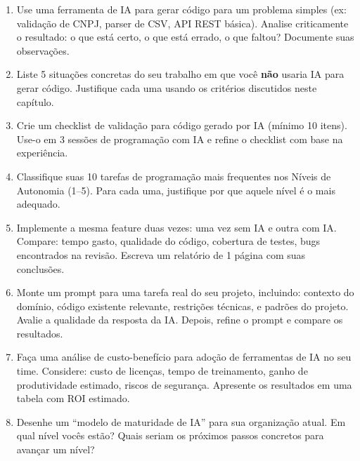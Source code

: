 \begin{enumerate}[leftmargin=2em]
    \item Use uma ferramenta de IA para gerar código para um problema
    simples (ex: validação de CNPJ, parser de CSV, API REST básica).
    Analise criticamente o resultado: o que está certo, o que está errado,
    o que faltou? Documente suas observações.

    \item Liste 5 situações concretas do seu trabalho em que você
    \textbf{não} usaria IA para gerar código. Justifique cada uma usando
    os critérios discutidos neste capítulo.

    \item Crie um checklist de validação para código gerado por IA (mínimo
    10 itens). Use-o em 3 sessões de programação com IA e refine o
    checklist com base na experiência.

    \item Classifique suas 10 tarefas de programação mais frequentes nos
    Níveis de Autonomia (1--5). Para cada uma, justifique por que aquele
    nível é o mais adequado.

    \item Implemente a mesma feature duas vezes: uma vez sem IA e outra
    com IA. Compare: tempo gasto, qualidade do código, cobertura de
    testes, bugs encontrados na revisão. Escreva um relatório de 1 página
    com suas conclusões.

    \item Monte um prompt para uma tarefa real do seu projeto, incluindo:
    contexto do domínio, código existente relevante, restrições técnicas, e
    padrões do projeto. Avalie a qualidade da resposta da IA. Depois,
    refine o prompt e compare os resultados.

    \item Faça uma análise de custo-benefício para adoção de ferramentas de
    IA no seu time. Considere: custo de licenças, tempo de treinamento,
    ganho de produtividade estimado, riscos de segurança. Apresente os
    resultados em uma tabela com ROI estimado.

    \item Desenhe um ``modelo de maturidade de IA'' para sua organização
    atual. Em qual nível vocês estão? Quais seriam os próximos passos
    concretos para avançar um nível?
\end{enumerate}
